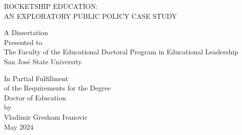
\begin{center}

\SingleSpacing
  ROCKETSHIP EDUCATION:\\\vspace{1ex}
  AN EXPLORATORY PUBLIC POLICY CASE STUDY\\
\DoubleSpacing
\vspace{6\baselineskip}

A Dissertation\\
Presented to\\
The Faculty of the Educational Doctoral Program in Educational Leadership\\
San José State University\\
\vspace{2\baselineskip}

In Partial Fulfillment\\
of the Requirements for the Degree\\
Doctor of Education\\
\vspace{3\baselineskip}
by\\
Vladimir Gresham Ivanovic\\
May 2024\\


\end{center}

\thispagestyle{empty}


